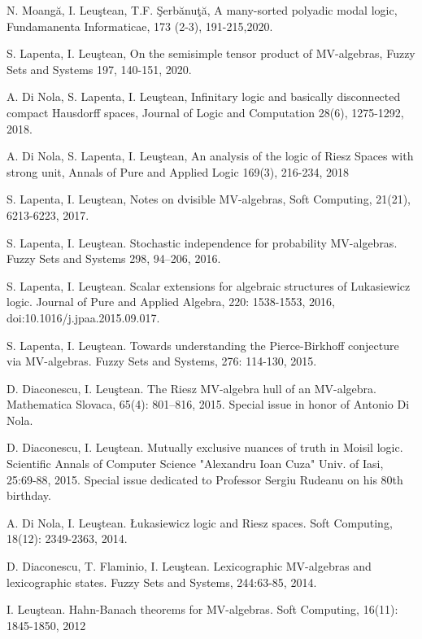\documentclass[11pt]{article}
\begin{document}
\noindent
[J30] N.  Moangă, I. Leu\c stean, T.F. Şerbănuţă, A many-sorted polyadic modal logic, Fundamanenta Informaticae, 173 (2-3), 191-215,2020.

\noindent 
[J29] S. Lapenta, I. Leu\c stean, On the semisimple tensor product of MV-algebras, Fuzzy Sets and Systems 197, 140-151, 2020.

\noindent 
[J28] A. Di Nola, S. Lapenta, I. Leu\c stean, Infinitary logic and basically disconnected compact Hausdorff spaces, Journal of Logic and Computation 28(6), 1275-1292, 2018.

\noindent 
[J27] A. Di Nola, S. Lapenta, I. Leu\c stean,  An analysis of the logic of Riesz Spaces with strong unit, Annals of Pure and Applied Logic 169(3), 216-234, 2018

\noindent 
[J26] S. Lapenta, I. Leu\c stean, Notes on dvisible MV-algebras, Soft Computing, 21(21), 6213-6223, 2017.

\noindent
[J25] S. Lapenta,  I. Leu\c stean. Stochastic independence for probability MV-algebras.
      Fuzzy Sets and Systems 298, 94–206, 2016.

\noindent
[J24] S. Lapenta,  I. Leu\c stean. Scalar extensions for algebraic structures of Lukasiewicz logic. 
      Journal of Pure and Applied Algebra, 220: 1538-1553, 2016, doi:10.1016/j.jpaa.2015.09.017. 

\noindent
[J23] S. Lapenta,  I. Leu\c stean. Towards understanding the Pierce-Birkhoff conjecture via MV-algebras. 
       Fuzzy Sets and Systems,  276: 114-130, 2015.

\noindent
[J22] D. Diaconescu, I. Leu\c stean.  The Riesz MV-algebra hull of an MV-algebra.  Mathematica Slovaca,  65(4): 801–816, 2015.  Special issue in honor of Antonio Di Nola.

\noindent
[J21] D. Diaconescu, I. Leu\c stean. Mutually exclusive nuances of truth in Moisil logic.  Scientific Annals of
      Computer Science "Alexandru Ioan Cuza" Univ. of Iasi, 25:69-88, 2015.
      Special issue dedicated to Professor Sergiu Rudeanu on his 80th birthday.


\noindent 
[J20] A. Di Nola, I. Leu\c stean. \L ukasiewicz logic and Riesz spaces. Soft Computing, 18(12): 2349-2363, 2014.

\noindent
[J19] D. Diaconescu, T.  Flaminio,  I. Leu\c stean.  Lexicographic MV-algebras and lexicographic states. 
     Fuzzy Sets and Systems,  244:63-85, 2014. 

\noindent
[J18] I. Leu\c stean. Hahn-Banach theorems for MV-algebras.
 Soft Computing,   16(11): 1845-1850, 2012
\end{document}
